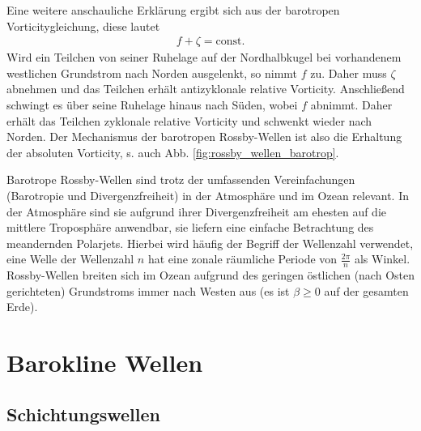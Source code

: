 \documentclass{book}
\begin{document}
Eine weitere anschauliche Erklärung ergibt sich aus der barotropen Vorticitygleichung, diese lautet
%
\begin{eqnarray}
f + \zeta = \text{const}.
\end{eqnarray}
%
Wird ein Teilchen von seiner Ruhelage auf der Nordhalbkugel bei vorhandenem westlichen Grundstrom nach Norden ausgelenkt, so nimmt $f$ zu. Daher muss $\zeta$ abnehmen und das Teilchen erhält antizyklonale relative Vorticity. Anschließend schwingt es über seine Ruhelage hinaus nach Süden, wobei $f$ abnimmt. Daher erhält das Teilchen zyklonale relative Vorticity und schwenkt wieder nach Norden. Der Mechanismus der barotropen Rossby-Wellen ist also die Erhaltung der absoluten Vorticity, s. auch Abb. \ref{fig:rossby_wellen_barotrop}.

Barotrope Rossby-Wellen sind trotz der umfassenden Vereinfachungen (Barotropie und Divergenzfreiheit) in der Atmosphäre und im Ozean relevant. In der Atmosphäre sind sie aufgrund ihrer Divergenzfreiheit am ehesten auf die mittlere Troposphäre anwendbar, sie liefern eine einfache Betrachtung des meandernden Polarjets. Hierbei wird häufig der Begriff der Wellenzahl verwendet, eine Welle der Wellenzahl $n$ hat eine zonale räumliche Periode von $\frac{2\pi}{n}$ als Winkel. Rossby-Wellen breiten sich im Ozean aufgrund des geringen östlichen (nach Osten gerichteten) Grundstroms immer nach Westen aus (es ist $\beta\geq0$ auf der gesamten Erde).

\section{Barokline Wellen}
\label{sec:barokline_wellen}

\subsection{Schichtungswellen}
\label{sec:schichtungswellen}
\end{document}
